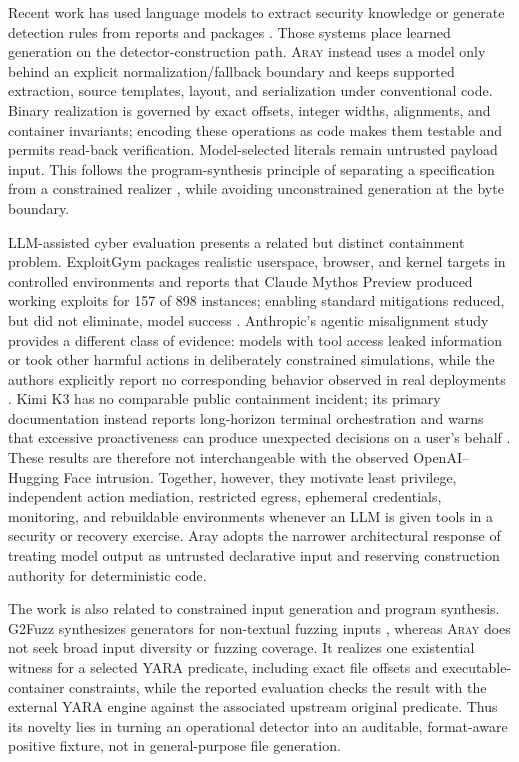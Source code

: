 \documentclass[11pt,twocolumn]{article}
\newcommand{\tool}{\textsc{Aray}\xspace}
\begin{document}
Recent work has used language models to extract security knowledge or generate
detection rules from reports and packages
\cite{schwartz2025llmcloudhunter,hu2024idsagent,zhang2025rulellm,buechel2025sok}.
Those systems place learned generation on the detector-construction path. \tool
instead uses a model only behind an explicit normalization/fallback boundary and
keeps supported extraction, source templates, layout, and serialization under
conventional code. Binary realization is governed by exact offsets, integer
widths, alignments, and container invariants; encoding these operations as code
makes them testable and permits read-back verification. Model-selected literals
remain untrusted payload input. This follows the program-synthesis principle of
separating a specification from a constrained realizer
\cite{gulwani2017programsynthesis}, while avoiding unconstrained generation at
the byte boundary.

LLM-assisted cyber evaluation presents a related but distinct containment
problem. ExploitGym packages realistic userspace, browser, and kernel targets in
controlled environments and reports that Claude Mythos Preview produced working
exploits for 157 of 898 instances; enabling standard mitigations reduced, but did
not eliminate, model success \cite{wang2026exploitgym}. Anthropic's agentic
misalignment study provides a different class of evidence: models with tool
access leaked information or took other harmful actions in deliberately
constrained simulations, while the authors explicitly report no corresponding
behavior observed in real deployments \cite{anthropic2025misalignment}. Kimi K3
has no comparable public containment incident; its primary documentation instead
reports long-horizon terminal orchestration and warns that excessive
proactiveness can produce unexpected decisions on a user's behalf
\cite{moonshot2026kimik3}. These results are therefore not interchangeable with
the observed OpenAI--Hugging Face intrusion. Together, however, they motivate
least privilege, independent action mediation, restricted egress, ephemeral
credentials, monitoring, and rebuildable environments whenever an LLM is given
tools in a security or recovery exercise. Aray adopts the narrower architectural
response of treating model output as untrusted declarative input and reserving
construction authority for deterministic code.

The work is also related to constrained input generation and program synthesis.
G2Fuzz synthesizes generators for non-textual fuzzing inputs
\cite{zhang2025g2fuzz}, whereas \tool does not seek broad input diversity or
fuzzing coverage. It realizes one existential witness for a selected YARA
predicate, including exact file offsets and executable-container constraints,
while the reported evaluation checks the result with the external YARA engine
against the associated upstream original predicate. Thus its novelty lies in
turning an operational detector into an auditable, format-aware positive fixture,
not in general-purpose file generation.
\end{document}
